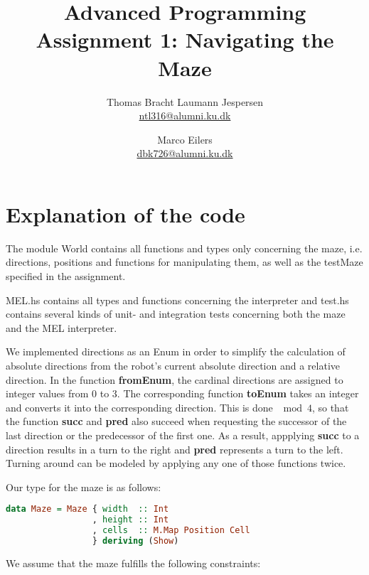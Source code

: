 \documentclass[a4paper]{article}
\title{Advanced Programming\\
Assignment 1: Navigating the Maze}
\author{Thomas Bracht Laumann Jespersen\\ \url{ntl316@alumni.ku.dk} \and Marco Eilers\\ \url{dbk726@alumni.ku.dk} }
\newcommand{\suc}{\textbf{succ }}
\newcommand{\prd}{\textbf{pred }}
\begin{document}
\maketitle


\section{Explanation of the code}
The module World contains all functions and types only concerning the maze, i.e. directions, positions and functions for manipulating them, as well as the testMaze specified in the assignment. 

MEL.hs contains all types and functions concerning the interpreter and test.hs contains several kinds of unit- and integration tests concerning both the maze and the MEL interpreter.

We implemented directions as an Enum in order to simplify the calculation of absolute directions from the robot's current absolute direction and a relative direction. In the function \textbf{fromEnum}, the cardinal directions are assigned to integer values from 0 to 3. The corresponding function \textbf{toEnum} takes an integer and converts it into the corresponding direction. This is done $\mod 4$, so that the function \suc and \prd also succeed when requesting the successor of the last direction or the predecessor of the first one. As a result, appplying \suc to a direction results in a turn to the right and \prd represents a turn to the left. Turning around can be modeled by applying any one of those functions twice.

Our type for the maze is as follows:
\begin{lstlisting}[language=haskell]
data Maze = Maze { width  :: Int
                 , height :: Int
                 , cells  :: M.Map Position Cell
                 } deriving (Show)
\end{lstlisting}


We assume that the maze fulfills the following constraints:  
\end{document}
